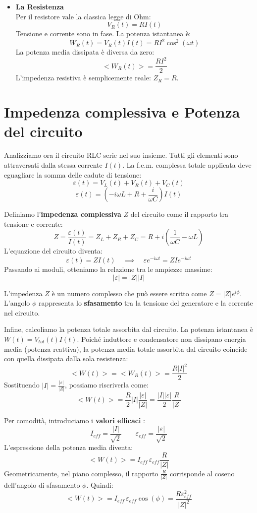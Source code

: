 \documentclass{book}
\begin{document}
\begin{itemize}
  \item \textbf{La Resistenza} \\
  Per il resistore vale la classica legge di Ohm:
  $$ V_R(t)= R I(t) $$
  Tensione e corrente sono in fase. La potenza istantanea è:
  $$ W_R(t) = V_R(t)I(t) = R I^2 \cos^2(\omega t) $$
  La potenza media dissipata è diversa da zero:
  $$ <W_R(t)> = \frac{R I^2}{2} $$
  L'impedenza resistiva è semplicemente reale: $Z_R = R$.
\end{itemize}

\section{Impedenza complessiva e Potenza del circuito}

Analizziamo ora il circuito RLC serie nel suo insieme. Tutti gli elementi sono attraversati dalla stessa corrente $I(t)$. La f.e.m. complessa totale applicata deve eguagliare la somma delle cadute di tensione:
$$ \varepsilon(t) = V_L(t) + V_R(t) + V_C(t) $$
$$ \varepsilon(t) = \left( -i\omega L + R + \frac{i}{\omega C} \right) I(t) $$

Definiamo l'\textbf{impedenza complessiva} $Z$ del circuito come il rapporto tra tensione e corrente:
$$ Z = \frac{\varepsilon(t)}{I(t)} = Z_L + Z_R + Z_C = R + i\left(\frac{1}{\omega C} - \omega L\right) $$
L'equazione del circuito diventa:
$$ \varepsilon(t) = Z I(t) \quad \implies \quad \varepsilon e^{-i\omega t} = Z I e^{-i\omega t} $$
Passando ai moduli, otteniamo la relazione tra le ampiezze massime:
$$ |\varepsilon| = |Z| |I| $$

L'impedenza $Z$ è un numero complesso che può essere scritto come $Z = |Z|e^{i\phi}$. L'angolo $\phi$ rappresenta lo \textbf{sfasamento} tra la tensione del generatore e la corrente nel circuito.

Infine, calcoliamo la potenza totale assorbita dal circuito.
La potenza istantanea è $W(t) = V_{tot}(t) I(t)$.
Poiché induttore e condensatore non dissipano energia media (potenza reattiva), la potenza media totale assorbita dal circuito coincide con quella dissipata dalla sola resistenza:
$$ <W(t)> = <W_R(t)> = \frac{R |I|^2}{2} $$
Sostituendo $|I| = \frac{|\varepsilon|}{|Z|}$, possiamo riscriverla come:
$$ <W(t)> = \frac{R}{2} |I| \frac{|\varepsilon|}{|Z|} = \frac{|I| |\varepsilon|}{2} \frac{R}{|Z|} $$

Per comodità, introduciamo i \textbf{valori efficaci} :
$$ I_{eff}=\frac{|I|}{\sqrt{2}} \qquad \varepsilon_{eff}=\frac{|\varepsilon|}{\sqrt{2}} $$
L'espressione della potenza media diventa:
$$ <W(t)> = I_{eff} \, \varepsilon_{eff} \frac{R}{|Z|} $$
Geometricamente, nel piano complesso, il rapporto $\frac{R}{|Z|}$ corrisponde al coseno dell'angolo di sfasamento $\phi$. Quindi:
$$ <W(t)> = I_{eff} \, \varepsilon_{eff} \cos(\phi) = \frac{R \varepsilon^2_{eff}}{|Z|^2} $$
\end{document}
